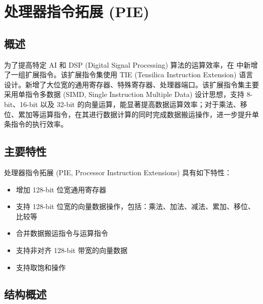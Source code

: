 \documentclass[main\_\_CN.tex]{subfiles}
\begin{document}

\ifglobal
\else
    {\let\clearpage\relax \listoftodos}
    \tableofcontents
\fi



\hypertarget{pie}{}
\chapter{处理器指令拓展 (PIE)}
\label{mod:pie}

\section{概述}
为了提高特定 AI 和 DSP (Digital Signal Processing) 算法的运算效率，在 \chipname{} 中新增了一组扩展指令。该扩展指令集使用 TIE (Tensilica Instruction  Extension) 语言设计。新增了大位宽的通用寄存器、特殊寄存器、处理器端口。该扩展指令集主要采用单指令多数据 (SIMD, Single Instruction Multiple Data) 设计思想，支持 8-bit、16-bit 以及 32-bit 的向量运算，能显著提高数据运算效率；对于乘法、移位、累加等运算指令，在其进行数据计算的同时完成数据搬运操作，进一步提升单条指令的执行效率。


\section{主要特性}

处理器指令拓展 (PIE, Processor Instruction Extensions) 具有如下特性：

\begin{itemize}
    \item 增加 128-bit 位宽通用寄存器
    \item 支持 128-bit 位宽的向量数据操作，包括：乘法、加法、减法、累加、移位、比较等
    \item 合并数据搬运指令与运算指令
    \item 支持非对齐 128-bit 带宽的向量数据
    \item 支持取饱和操作

\end{itemize}

\section{结构概述}
\end{document}
